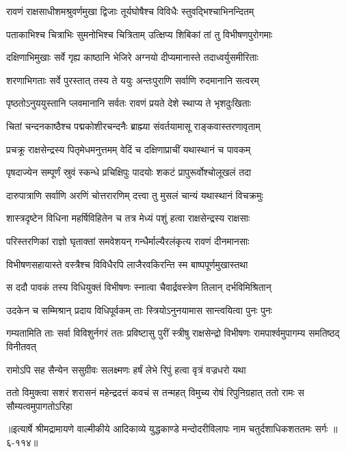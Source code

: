 \twolineshloka
{रावणं राक्षसाधीशमश्रुवर्णमुखा द्विजाः}
{तूर्यघोषैश्च विविधैः स्तुवद्भिश्चाभिनन्दितम्} %

\twolineshloka
{पताकाभिश्च चित्राभिः सुमनोभिश्च चित्रिताम्}
{उत्क्षिप्य शिबिकां तां तु विभीषणपुरोगमाः} %

\twolineshloka
{दक्षिणाभिमुखाः सर्वे गृह्य काष्ठानि भेजिरे}
{अग्नयो दीप्यमानास्ते तदाध्वर्युसमीरिताः} %

\twolineshloka
{शरणाभिगताः सर्वे पुरस्तात् तस्य ते ययुः}
{अन्तःपुराणि सर्वाणि रुदमानानि सत्वरम्} %

\twolineshloka
{पृष्ठतोऽनुययुस्तानि प्लवमानानि सर्वतः}
{रावणं प्रयते देशे स्थाप्य ते भृशदुःखिताः} %

\twolineshloka
{चितां चन्दनकाष्ठैश्च पद्मकोशीरचन्दनैः}
{ब्राह्म्या संवर्तयामासू राङ्कवास्तरणावृताम्} %

\twolineshloka
{प्रचक्रू राक्षसेन्द्रस्य पितृमेधमनुत्तमम्}
{वेदिं च दक्षिणाप्राचीं यथास्थानं च पावकम्} %

\twolineshloka
{पृषदाज्येन सम्पूर्णं स्रुवं स्कन्धे प्रचिक्षिपुः}
{पादयोः शकटं प्रापुरूर्वोश्चोलूखलं तदा} %

\twolineshloka
{दारुपात्राणि सर्वाणि अरणिं चोत्तरारणिम्}
{दत्त्वा तु मुसलं चान्यं यथास्थानं विचक्रमुः} %

\twolineshloka
{शास्त्रदृष्टेन विधिना महर्षिविहितेन च}
{तत्र मेध्यं पशुं हत्वा राक्षसेन्द्रस्य राक्षसाः} %

\twolineshloka
{परिस्तरणिकां राज्ञो घृताक्तां समवेशयन्}
{गन्धैर्माल्यैरलंकृत्य रावणं दीनमानसाः} %

\twolineshloka
{विभीषणसहायास्ते वस्त्रैश्च विविधैरपि}
{लाजैरवकिरन्ति स्म बाष्पपूर्णमुखास्तथा} %

\twolineshloka
{स ददौ पावकं तस्य विधियुक्तं विभीषणः}
{स्नात्वा चैवार्द्रवस्त्रेण तिलान् दर्भविमिश्रितान्} %

\twolineshloka
{उदकेन च सम्मिश्रान् प्रदाय विधिपूर्वकम्}
{ताः स्त्रियोऽनुनयामास सान्त्वयित्वा पुनः पुनः} %

\threelineshloka
{गम्यतामिति ताः सर्वा विविशुर्नगरं ततः}
{प्रविष्टासु पुरीं स्त्रीषु राक्षसेन्द्रो विभीषणः}
{रामपार्श्वमुपागम्य समतिष्ठद् विनीतवत्} %

\twolineshloka
{रामोऽपि सह सैन्येन ससुग्रीवः सलक्ष्मणः}
{हर्षं लेभे रिपुं हत्वा वृत्रं वज्रधरो यथा} %

\twolineshloka
{ततो विमुक्त्वा सशरं शरासनं महेन्द्रदत्तं कवचं स तन्महत्}
{विमुच्य रोषं रिपुनिग्रहात् ततो रामः स सौम्यत्वमुपागतोऽरिहा} %


॥इत्यार्षे श्रीमद्रामायणे वाल्मीकीये आदिकाव्ये युद्धकाण्डे मन्दोदरीविलापः नाम चतुर्दशाधिकशततमः सर्गः ॥६-११४॥
